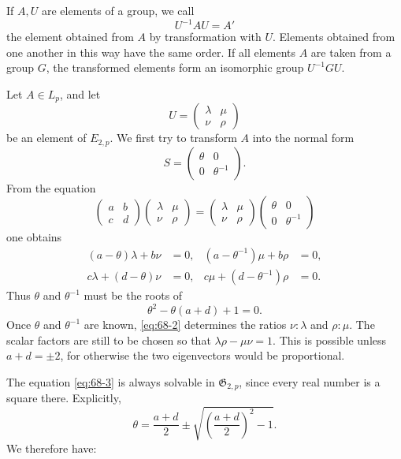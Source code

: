 \documentclass[11pt]{article}
\begin{document}
If \(A,U\) are elements of a group, we call
\[
 U^{-1}AU=A'
\]
the element obtained from \(A\) by transformation with \(U\).  Elements obtained from one another in this way have the same order.  If all elements \(A\) are taken from a group \(G\), the transformed elements form an isomorphic group \(U^{-1}GU\).

Let \(A\in L_p\), and let
\[
 U=\begin{pmatrix}\lambda&\mu\\\nu&\rho\end{pmatrix}
\]
be an element of \(E_{2,p}\).  We first try to transform \(A\) into the normal form
\begin{equation}\label{eq:68-1}
 S=\begin{pmatrix}\theta&0\\0&\theta^{-1}\end{pmatrix}.
\end{equation}
From the equation
\[
 \begin{pmatrix}a&b\\c&d\end{pmatrix}
 \begin{pmatrix}\lambda&\mu\\\nu&\rho\end{pmatrix}
 =
 \begin{pmatrix}\lambda&\mu\\\nu&\rho\end{pmatrix}
 \begin{pmatrix}\theta&0\\0&\theta^{-1}\end{pmatrix}
\]
one obtains
\begin{align}
 (a-\theta)\lambda+b\nu&=0,
 &(a-\theta^{-1})\mu+b\rho&=0,\nonumber\\
 c\lambda+(d-\theta)\nu&=0,
 &c\mu+(d-\theta^{-1})\rho&=0.\label{eq:68-2}
\end{align}
Thus \(\theta\) and \(\theta^{-1}\) must be the roots of
\begin{equation}\label{eq:68-3}
 \theta^2-\theta(a+d)+1=0.
\end{equation}
Once \(\theta\) and \(\theta^{-1}\) are known, \eqref{eq:68-2} determines the ratios \(\nu:\lambda\) and \(\rho:\mu\).  The scalar factors are still to be chosen so that \(\lambda\rho-\mu\nu=1\).  This is possible unless \(a+d=\pm2\), for otherwise the two eigenvectors would be proportional.

The equation \eqref{eq:68-3} is always solvable in \(\mathfrak G_{2,p}\), since every real number is a square there.  Explicitly,
\begin{equation}\label{eq:68-5}
 \theta=\frac{a+d}{2}\pm\sqrt{\left(\frac{a+d}{2}\right)^2-1}.
\end{equation}
We therefore have:
\end{document}
